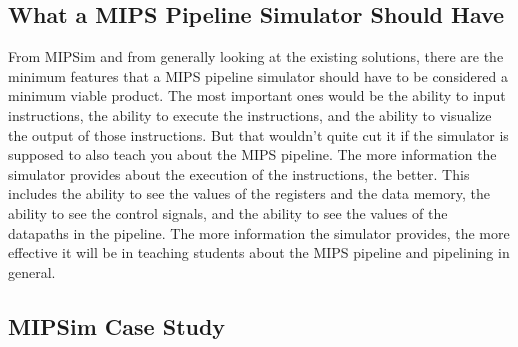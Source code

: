 \subsection{What a MIPS Pipeline Simulator Should Have}\label{sec:minimum_features}

From MIPSim and from generally looking at the existing solutions, there are the minimum features that a MIPS pipeline simulator should have to be considered a minimum viable product. The most important ones would be the ability to input instructions, the ability to execute the instructions, and the ability to visualize the output of those instructions. But that wouldn't quite cut it if the simulator is supposed to also teach you about the MIPS pipeline. The more information the simulator provides about the execution of the instructions, the better. This includes the ability to see the values of the registers and the data memory, the ability to see the control signals, and the ability to see the values of the datapaths in the pipeline. The more information the simulator provides, the more effective it will be in teaching students about the MIPS pipeline and pipelining in general.


\subsection{MIPSim Case Study}

